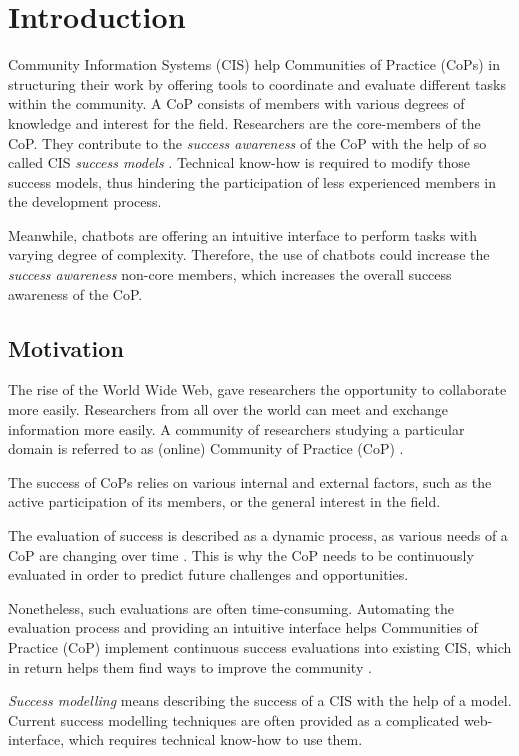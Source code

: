 \chapter{Introduction}
Community Information Systems (CIS) help Communities of Practice (CoPs) in structuring their work by offering tools to coordinate and evaluate different tasks within the community.
A CoP consists of members with various degrees of knowledge and interest for the field.
Researchers are the core-members of the CoP.
They contribute to the \emph{success awareness} of the CoP with the help of so called CIS \emph{success models} \cite{Klam10c}.
Technical know-how is required to modify those success models, thus hindering the participation of less experienced members
in the development process.

Meanwhile, chatbots are offering an intuitive interface to perform tasks with varying degree of complexity. 
Therefore, the use of chatbots could increase the \emph{success awareness} non-core members, which increases the overall success awareness of the CoP.

\section{Motivation}
The rise of the World Wide Web, gave researchers the opportunity to collaborate more easily. Researchers from all over the world can meet and exchange information more easily. A community of researchers studying a particular domain is referred to as (online) Community of Practice (CoP) \cite{Renz08}.

The success of CoPs relies on various internal and external factors, such as the active participation of its members, or the general interest in the field.

The evaluation of success is described as a dynamic process, as various needs of a CoP are changing over time \cite{Renz08,GKJa08}.
This is why the CoP needs to be continuously evaluated in order to predict future challenges and opportunities.

Nonetheless, such evaluations are often time-consuming. Automating the evaluation process and providing an intuitive interface helps Communities of Practice (CoP) implement continuous success evaluations into existing CIS, which in return helps them find ways to improve the community \cite{Renz08}.

\emph{Success modelling} means describing the success of a CIS with the help of a model. Current success modelling techniques are often provided as a complicated web-interface, which requires technical know-how to use them.

